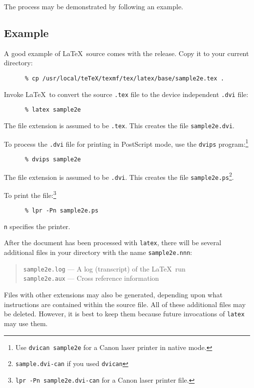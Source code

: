 \documentclass[11pt,twoside]{article}
\newcommand{\xlabel}[1]{}
\begin{document}
The process may be demonstrated by following an example.

\subsection{\xlabel{example}Example}
\label{se:example}
A good example of \LaTeX\ source comes with the release.
Copy it to your current directory:
\begin{verbatim}
      % cp /usr/local/teTeX/texmf/tex/latex/base/sample2e.tex .
\end{verbatim}
Invoke \LaTeX\ to convert the source
\texttt{.tex} file to the device independent \texttt{.dvi} file:
\begin{verbatim}
      % latex sample2e
\end{verbatim}
The file extension is assumed to be \texttt{.tex}.
This creates the file \texttt{sample2e.dvi}.

To process the \texttt{.dvi} file for printing in PostScript mode,
use the \texttt{dvips} program:\footnote{Use \texttt{dvican sample2e}
for a Canon laser printer in native mode.}

\begin{verbatim}
      % dvips sample2e
\end{verbatim}

The file extension is assumed to be \texttt{.dvi}.
This creates the file \texttt{sample2e.ps}\footnote{\texttt{sample.dvi-can}
if you used \texttt{dvican}}.

To print the file:\footnote{\texttt{lpr -Pn sample2e.dvi-can} for a Canon laser
printer file.}
\begin{verbatim}
      % lpr -Pn sample2e.ps
\end{verbatim}

\texttt{n} specifies the printer.

After the document has been processed with \texttt{latex},
there will be several additional files
in your directory with the name \texttt{sample2e.nnn}:
\begin{quote}
  \texttt{sample2e.log} --- A log (transcript) of the \LaTeX\ run\\
  \texttt{sample2e.aux} --- Cross reference information
\end{quote}

Files with other extensions may also be generated, depending upon what
instructions are contained within the source file.
All of these additional files may be deleted. However, it is best to keep them
because future invocations of \texttt{latex} may use them.
\end{document}

